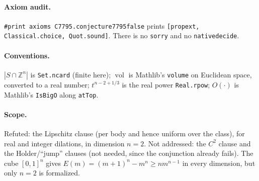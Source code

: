 \documentclass[11pt]{article}
\renewcommand{\_}{\oldus\allowbreak}
\theoremstyle{definition}
\theoremstyle{remark}
\begin{document}
\paragraph{Axiom audit.} \texttt{\#print axioms C7795.conjecture7795\_false} prints
\texttt{[propext, Classical.choice, Quot.sound]}. There is no \texttt{sorry} and no
\texttt{native\_decide}.

\paragraph{Conventions.} $|S\cap\mathbb Z^n|$ is \texttt{Set.ncard} (finite here);
$\operatorname{vol}$ is Mathlib's \texttt{volume} on Euclidean space, converted to a real number;
$t^{n-2+1/3}$ is the real power \texttt{Real.rpow}; $O(\cdot)$ is Mathlib's \texttt{IsBigO} along
\texttt{atTop}.

\paragraph{Scope.} Refuted: the Lipschitz clause (per body and hence uniform over the class), for real
and integer dilations, in dimension $n=2$. Not addressed: the $C^2$ clause and the
Holder/``jump'' clauses (not needed, since the conjunction already fails). The cube $[0,1]^n$ gives
$E(m)=(m+1)^n-m^n\ge n m^{n-1}$ in every dimension, but only $n=2$ is formalized.
\end{document}
